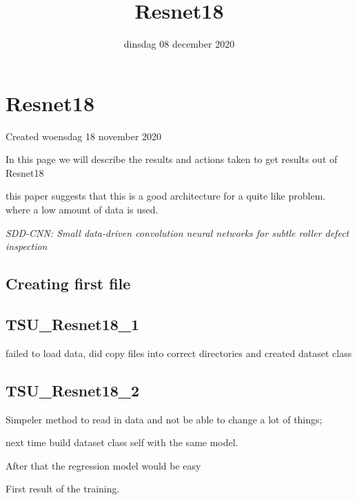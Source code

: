 \documentclass{scrartcl}
\title{Resnet18}
\date{dinsdag 08 december 2020}
\author{}
\begin{document}
\maketitle

		\section{Resnet18}

Created woensdag 18 november 2020



In this page we will describe the results and actions taken to get results out of Resnet18



this paper suggests that this is a good architecture for a quite like problem. where a low amount of data is used.

	\emph{SDD-CNN: Small data-driven convolution neural networks for subtle roller defect inspection}
	


\subsection{Creating first file}



\subsection{TSU\_Resnet18\_1}



failed to load data, did copy files into correct directories and created dataset class



\subsection{TSU\_Resnet18\_2}



Simpeler method to read in data and not be able to change a lot of things;

next time build dataset class self with the same model. 

After that the regression model would be easy



First result of the training.
\end{document}
